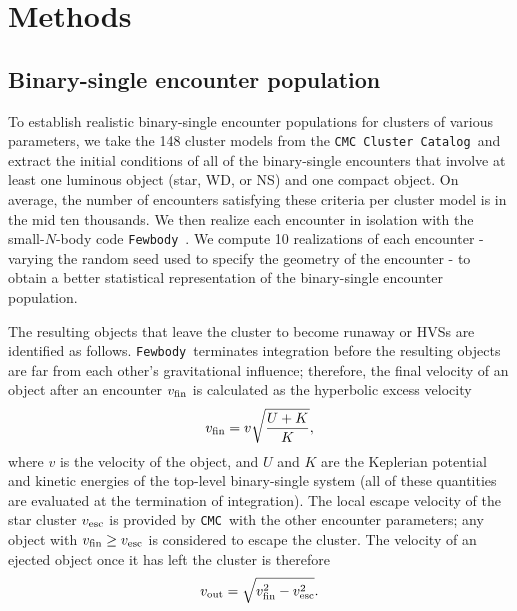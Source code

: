 \documentclass[twocolumn]{aastex631}
\newcommand{\CMC}{\texttt{CMC}}
\newcommand{\CMCcat}{\texttt{CMC Cluster Catalog}}
\newcommand{\fewbody}{\texttt{Fewbody}}
\begin{document}
\section{Methods} \label{sec:methods}

\subsection{Binary-single encounter population} \label{subsec:binsingle_pop}

To establish realistic binary-single encounter populations for clusters of various parameters, we take the 148 cluster models from the \CMCcat\ and extract the initial conditions of all of the binary-single encounters that involve at least one luminous object (star, WD, or NS) and one compact object.
On average, the number of encounters satisfying these criteria per cluster model is in the mid ten thousands.
We then realize each encounter in isolation with the small-$N$-body code \fewbody\ \citep{2004MNRAS.352....1F}.
We compute 10 realizations of each encounter - varying the random seed used to specify the geometry of the encounter - to obtain a better statistical representation of the binary-single encounter population.

The resulting objects that leave the cluster to become runaway or HVSs are identified as follows.
\fewbody\ terminates integration before the resulting objects are far from each other's gravitational influence; therefore, the final velocity of an object after an encounter $v_{\rm fin}$ is calculated as the hyperbolic excess velocity
\begin{equation}
    v_{\rm fin} = v \sqrt{\frac{U + K}{K}},
\end{equation}
where $v$ is the velocity of the object, and $U$ and $K$ are the Keplerian potential and kinetic energies of the top-level binary-single system (all of these quantities are evaluated at the termination of integration).
The local escape velocity of the star cluster $v_{\rm esc}$ is provided by \CMC\ with the other encounter parameters; any object with $v_{\rm fin} \ge v_{\rm esc}$ is considered to escape the cluster.
The velocity of an ejected object once it has left the cluster is therefore
\begin{equation}
    v_{\rm out} = \sqrt{v_{\rm fin}^2 - v_{\rm esc}^2}.
\end{equation}
\end{document}
